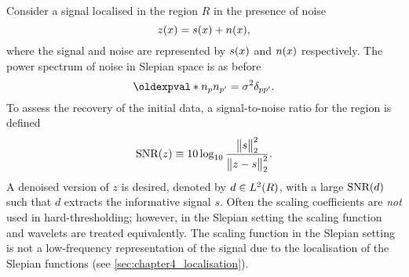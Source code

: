 Consider a signal localised in the region \(R\) in the presence of noise
%
\begin{equation}\label{eq:chapter4_noised_signal}
	z(x)
	= s(x) + n(x),
\end{equation}
%
where the signal and noise are represented by \(s(x)\) and \(n(x)\) respectively.
The power spectrum of noise in Slepian space is as before
%
\begin{equation}
	\expval{\slepian{n} \slepian[']{n}}
	= \sigma^{2} \delta_{pp'}.
\end{equation}
%
To assess the recovery of the initial data, a signal-to-noise ratio for the region is defined
%
\begin{equation}
	\text{SNR}(z)
	\equiv 10 \log_{10} \frac{{\big\lVert s\big\rVert}_{2}^{2}}{{\big\lVert z - s\big\rVert}_{2}^{2}}.
\end{equation}
%
A denoised version of \(z\) is desired, denoted by \(d \in L^{2}(R)\), with a large \(\text{SNR}(d)\) such that \(d\) extracts the informative signal \(s\).
Often the scaling coefficients are \emph{not} used in hard-thresholding; however, in the Slepian setting the scaling function and wavelets are treated equivalently.
The scaling function in the Slepian setting is not a low-frequency representation of the signal due to the localisation of the Slepian functions (see \cref{sec:chapter4_localisation}).

